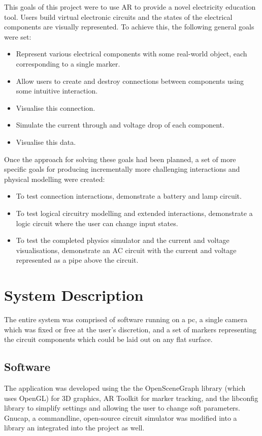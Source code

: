 This goals of this project were to use AR to provide a novel electricity education tool. Users build virtual electronic circuits and the states of the electrical components are visually represented. To achieve this, the following general goals were set:

\begin{itemize}
\item Represent various electrical components with some real-world object, each corresponding to a single marker.
\item Allow users to create and destroy connections between components using some intuitive interaction.
\item Visualise this connection.
\item Simulate the current through and voltage drop of each component.
\item Visualise this data.
\end{itemize}

Once the approach for solving these goals had been planned, a set of more specific goals for producing incrementally more challenging interactions and physical modelling were created:

\begin{itemize}
\item To test connection interactions, demonstrate a battery and lamp circuit.
\item To test logical circuitry modelling and extended interactions, demonstrate a logic circuit where the user can change input states.
\item To test the completed physics simulator and the current and voltage visualisations, demonstrate an AC circuit with the current and voltage represented as a pipe above the circuit.
\end{itemize}

\section{System Description}
The entire system was comprised of software running on a pc,
a single camera which was fixed or free at the user's discretion,
and a set of markers representing the circuit components which
could be laid out on any flat surface.

\subsection{Software}
The application was developed using the the OpenSceneGraph library
(which uses OpenGL) for 3D graphics, AR Toolkit for marker
tracking, and the libconfig library to simplify settings and
allowing the user to change soft parameters. Gnucap, a commandline,
open-source circuit simulator was modified into a library an
integrated into the project as well.

